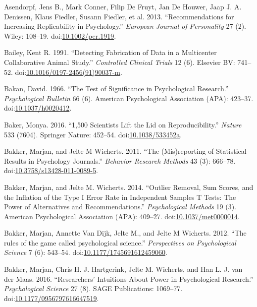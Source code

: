 \documentclass[a5paper]{book}
\begin{document}
\hypertarget{ref-doi:10.1002ux2fper.1919}{}
Asendorpf, Jens B., Mark Conner, Filip De Fruyt, Jan De Houwer, Jaap J.
A. Denissen, Klaus Fiedler, Susann Fiedler, et al. 2013.
``Recommendations for Increasing Replicability in Psychology.''
\emph{European Journal of Personality} 27 (2). Wiley: 108--19.
doi:\href{https://doi.org/10.1002/per.1919}{10.1002/per.1919}.

\hypertarget{ref-doi:10.1016ux2f0197-24569190037-M}{}
Bailey, Kent R. 1991. ``Detecting Fabrication of Data in a Multicenter
Collaborative Animal Study.'' \emph{Controlled Clinical Trials} 12 (6).
Elsevier BV: 741--52.
doi:\href{https://doi.org/10.1016/0197-2456(91)90037-m}{10.1016/0197-2456(91)90037-m}.

\hypertarget{ref-doi:10.1037ux2fh0020412}{}
Bakan, David. 1966. ``The Test of Significance in Psychological
Research.'' \emph{Psychological Bulletin} 66 (6). American Psychological
Association (APA): 423--37.
doi:\href{https://doi.org/10.1037/h0020412}{10.1037/h0020412}.

\hypertarget{ref-doi:10.1038ux2f533452a}{}
Baker, Monya. 2016. ``1,500 Scientists Lift the Lid on
Reproducibility.'' \emph{Nature} 533 (7604). Springer Nature: 452--54.
doi:\href{https://doi.org/10.1038/533452a}{10.1038/533452a}.

\hypertarget{ref-doi:10.3758ux2fs13428-011-0089-5}{}
Bakker, Marjan, and Jelte M Wicherts. 2011. ``The (Mis)reporting of
Statistical Results in Psychology Journals.'' \emph{Behavior Research
Methods} 43 (3): 666--78.
doi:\href{https://doi.org/10.3758/s13428-011-0089-5}{10.3758/s13428-011-0089-5}.

\hypertarget{ref-doi:10.1037ux2fmet0000014}{}
Bakker, Marjan, and Jelte M. Wicherts. 2014. ``Outlier Removal, Sum
Scores, and the Inflation of the Type I Error Rate in Independent
Samples T Tests: The Power of Alternatives and Recommendations.''
\emph{Psychological Methods} 19 (3). American Psychological Association
(APA): 409--27.
doi:\href{https://doi.org/10.1037/met0000014}{10.1037/met0000014}.

\hypertarget{ref-doi:10.1177ux2f1745691612459060}{}
Bakker, Marjan, Annette Van Dijk, Jelte M., and Jelte M Wicherts. 2012.
``The rules of the game called psychological science.''
\emph{Perspectives on Psychological Science} 7 (6): 543--54.
doi:\href{https://doi.org/10.1177/1745691612459060}{10.1177/1745691612459060}.

\hypertarget{ref-doi:10.1177ux2f0956797616647519}{}
Bakker, Marjan, Chris H. J. Hartgerink, Jelte M. Wicherts, and Han L. J.
van der Maas. 2016. ``Researchers' Intuitions About Power in
Psychological Research.'' \emph{Psychological Science} 27 (8). SAGE
Publications: 1069--77.
doi:\href{https://doi.org/10.1177/0956797616647519}{10.1177/0956797616647519}.
\end{document}
